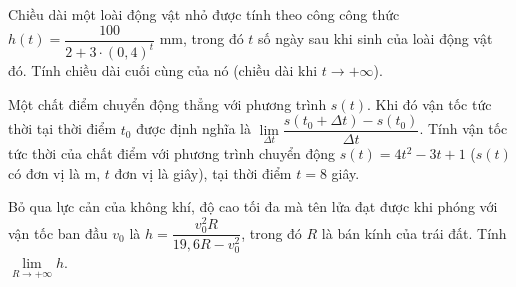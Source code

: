 \begin{bt}%
	Chiều dài một loài động vật nhỏ được tính theo công công thức $h(t)=\dfrac{100}{2+3 \cdot  (0{,}4)^t}$ mm, trong đó $t$ số ngày sau khi sinh của loài động vật đó. Tính chiều dài  cuối cùng của nó (chiều dài khi $t \to +\infty$).
\end{bt}

\begin{bt}%
	Một chất điểm chuyển động thẳng với phương trình $s(t)$. Khi đó vận tốc tức thời tại thời điểm $t_0$ được định nghĩa là $\displaystyle \lim \limits_{\Delta t} \dfrac{s(t_0+ \Delta t) - s(t_0)}{\Delta t}$. Tính vận tốc tức thời của chất điểm với phương trình chuyển động $s(t) = 4t^2-3t+1$ ($s(t)$ có đơn vị là m, $t$ đơn vị là giây), tại thời điểm $t=8$ giây. 
\end{bt}

\begin{bt}%
	Bỏ qua lực cản của không khí, độ cao tối đa mà tên lửa đạt được khi phóng với vận tốc ban đầu $v_0$ là $h=\dfrac{v_0^2 R}{19{,}6 R-v_0^2}$, trong đó $R$ là bán kính của trái đất. Tính  $\displaystyle \lim \limits_{R \to +\infty} h$. 
\end{bt}


